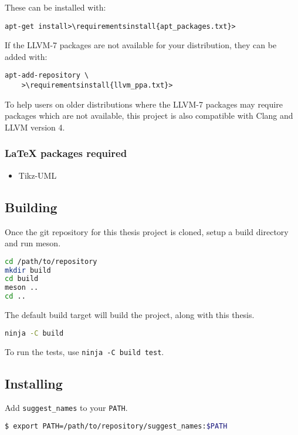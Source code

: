 These can be installed with:
\begin{lstlisting}[caption={Installing apt requirements}, escapechar=>,
		breaklines=true]
apt-get install>\requirementsinstall{apt_packages.txt}>
\end{lstlisting}
If the LLVM-7 packages are not available for your distribution, they can be
added with:
\begin{lstlisting}[caption={Adding the LLVM apt repository}, escapechar=>]
apt-add-repository \
	>\requirementsinstall{llvm_ppa.txt}>
\end{lstlisting}

To help users on older distributions where the LLVM-7 packages may require
packages which are not available, this project is also compatible with Clang and
LLVM version 4.

\subsubsection{\LaTeX{} packages required}
\begin{itemize}
	\item Tikz-UML \cite{tikzuml}
\end{itemize}

\subsection{Building}
Once the git \cite{git} repository for this thesis project is cloned, setup a
build directory and run meson.
\begin{lstlisting}[language=bash]
cd /path/to/repository
mkdir build
cd build
meson ..
cd ..
\end{lstlisting}

The default build target will build the project, along with this thesis.
\begin{lstlisting}[language=bash]
ninja -C build
\end{lstlisting}

To run the tests, use \lstinline|ninja -C build test|.

\subsection{Installing}
Add \lstinline|suggest_names| to your \lstinline|PATH|.
\begin{lstlisting}[language=bash]
$ export PATH=/path/to/repository/suggest_names:$PATH
\end{lstlisting}


